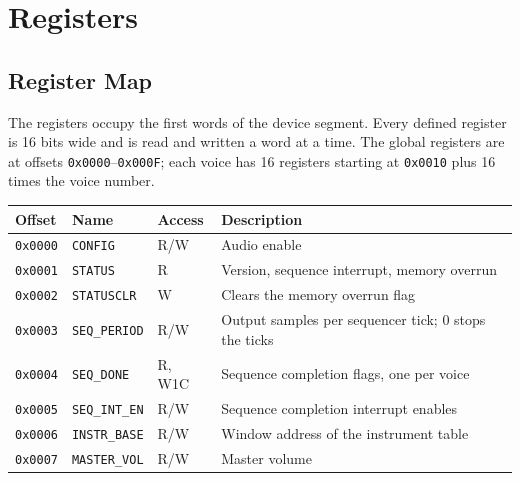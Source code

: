 \chapter{Registers}
\label{ch:registers}

\section{Register Map}

The registers occupy the first words of the device segment. Every defined register is 16 bits wide and is read and
written a word at a time. The global registers are at offsets \texttt{0x0000}--\texttt{0x000F}; each voice has 16
registers starting at \texttt{0x0010} plus 16 times the voice number.

\begin{table}[H]
	\centering
	\begin{tabular}{lllp{6.2cm}}
		\toprule
		\textbf{Offset}                  & \textbf{Name}              & \textbf{Access} & \textbf{Description}                                             \\
		\midrule
		\texttt{0x0000}                  & \texttt{CONFIG}            & R/W             & Audio enable                                                     \\
		\texttt{0x0001}                  & \texttt{STATUS}            & R               & Version, sequence interrupt, memory overrun                      \\
		\texttt{0x0002}                  & \texttt{STATUSCLR}         & W               & Clears the memory overrun flag                                   \\
		\texttt{0x0003}                  & \texttt{SEQ\_PERIOD}       & R/W             & Output samples per sequencer tick; 0 stops the ticks             \\
		\texttt{0x0004}                  & \texttt{SEQ\_DONE}         & R, W1C          & Sequence completion flags, one per voice                         \\
		\texttt{0x0005}                  & \texttt{SEQ\_INT\_EN}      & R/W             & Sequence completion interrupt enables                            \\
		\texttt{0x0006}                  & \texttt{INSTR\_BASE}       & R/W             & Window address of the instrument table                           \\
		\texttt{0x0007}                  & \texttt{MASTER\_VOL}       & R/W             & Master volume                                                    \\

\end{tabular}
\end{table}
